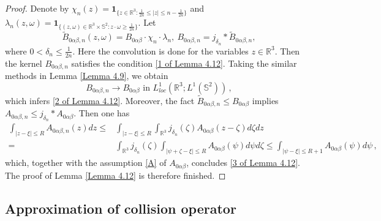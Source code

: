 \documentclass[reqno,11pt]{amsart}
\numberwithin{equation}{section}
\def\R{\mathbb{R}}
\begin{document}
		\begin{proof}
	Denote by $	\chi_n (z) = \mathbf{1}_{ \{z\in \R^3 :\frac{1}{2n}\leq |z|\leq n-\frac{1}{2n} \} }$ and $\lambda_n(z, \omega ) = \mathbf{1}_{ \{(z, \omega )\in \R^3 \times \mathbb{S}^2: z\cdot \omega \geq \frac{1}{2n}\} }$. Let
	\begin{equation*}
		\tilde{B}_{0\alpha \beta ,n} (z,\omega )=B_{0\alpha \beta }\cdot \chi_n \cdot \lambda_n,\  B_{0\alpha \beta ,n } =j_{\delta_n }* \tilde{B}_{0\alpha \beta ,n},
	\end{equation*}
where $0< \delta_n \leq \frac{1}{2n}.$ Here the convolution is done for the variables $z \in \R^3$. Then the kernel $B_{0\alpha \beta ,n }$ satisfies the condition \eqref{1 of Lemma 4.12}. Taking the similar methods in Lemma \ref{Lemma 4.9}, we obtain
	\begin{equation*}
		B_{0\alpha \beta ,n } \rightarrow B_{0\alpha \beta} \text{ in } L^1_{loc} (\R^3 ; L^1( \mathbb{S}^2 )) \,,
	\end{equation*}
which infers \eqref{2 of Lemma 4.12}. Moreover, the fact $\tilde{B}_{0\alpha \beta ,n}\leq B_{0\alpha \beta}$ implies $A_{0\alpha \beta ,n } \leq j_{\delta_n}* A_{0\alpha \beta }.$ Then one has
	\begin{equation*}
		\begin{aligned}
			\int_{|z-\xi|\leq R}  A_{0\alpha \beta ,n } (z )dz 
			\leq & \int_{|z-\xi|\leq R}\int_{\R^3} j_{\delta_n}(\zeta) A_{0\alpha \beta } (z-\zeta ) d\zeta dz \\
			= & \int_{\R^3} j_{\delta_n}(\zeta )  \int_{|\psi +\zeta - \xi |\leq R} A_{0\alpha \beta }(\psi ) d\psi d\zeta \leq \int_{|\psi - \xi |\leq R+1}  A_{0\alpha \beta }(\psi) d\psi \,,
		\end{aligned}
	\end{equation*}
which, together with the assumption \eqref{A} of $A_{0 \alpha \beta}$, concludes \eqref{3 of Lemma 4.12}. The proof of Lemma \ref{Lemma 4.12} is therefore finished.
\end{proof}	




\subsection{Approximation of collision operator}
\end{document}
